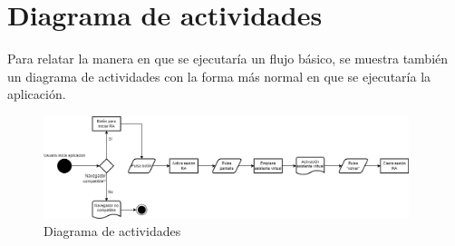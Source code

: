 \documentclass{subfiles}
\begin{document}
        \section{Diagrama de actividades}
        \label{sec:diagrama_de_actividades}
        
Para relatar la manera en que se ejecutaría un flujo básico, se muestra también un diagrama de actividades con la forma más normal en que se ejecutaría la aplicación.

\begin{figure}[ht]
\centering
\includegraphics[width=0.95\textwidth]{img/analisis_y_diseno_diagrama_de_actividades.png}
\caption{Diagrama de actividades}
\label{fig:analisis_y_diseno_diagrama_de_actividades}
\end{figure}
\end{document}
